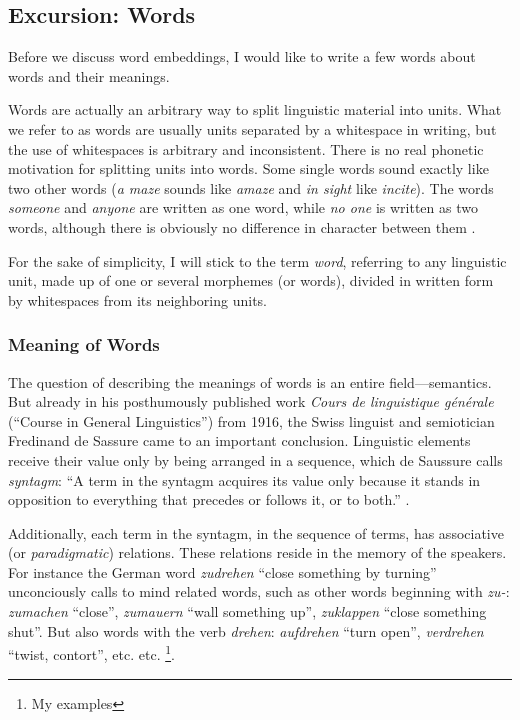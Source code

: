 \subsection{Excursion: Words}
Before we discuss word embeddings, I would like to write a few words about words and their meanings.

Words are actually an arbitrary way to split linguistic material into units. 
What we refer to as words are usually units separated by a whitespace in writing, but the use of whitespaces is arbitrary and inconsistent. 
There is no real phonetic motivation for splitting units into words. 
Some single words sound exactly like two other words (\emph{a maze} sounds like \emph{amaze} and \emph{in sight} like \emph{incite}). 
The words \emph{someone} and \emph{anyone} are written as one word, while \emph{no one} is written as two words, although there is obviously no difference in character between them \autocite[92-95]{Jespersen1924}.

For the sake of simplicity, I will stick to the term \emph{word}, referring to any linguistic unit, made up of one or several morphemes (or words), divided in written form by whitespaces from its neighboring units.

\subsubsection{Meaning of Words}
The question of describing the meanings of words is an entire field---semantics. But already in his posthumously published work \emph{Cours de linguistique générale} (\enquote{Course in General Linguistics}) from 1916, the Swiss linguist and semiotician Fredinand de Sassure came to an important conclusion. 
Linguistic elements receive their value only by being arranged in a sequence, which de Saussure calls \emph{syntagm}: 
\enquote{A term in the syntagm acquires its value only because it stands in opposition to everything that precedes or follows it, or to both.} \autocite[123]{de-saussure-1959-course}. 

Additionally, each term in the syntagm, in the sequence of terms, has associative (or \emph{paradigmatic}) relations. 
These relations reside in the memory of the speakers. 
For instance the German word \emph{zudrehen} \enquote{close something by turning} unconciously calls to mind related words, such as other words beginning with \emph{zu-}: \emph{zumachen} \enquote{close}, \emph{zumauern} \enquote{wall something up}, \emph{zuklappen} \enquote{close something shut}. 
But also words with the verb \emph{drehen}: \emph{aufdrehen} \enquote{turn open}, \emph{verdrehen} \enquote{twist, contort}, etc. etc. \autocite[122-127]{de-saussure-1959-course}\footnote{My examples}.


